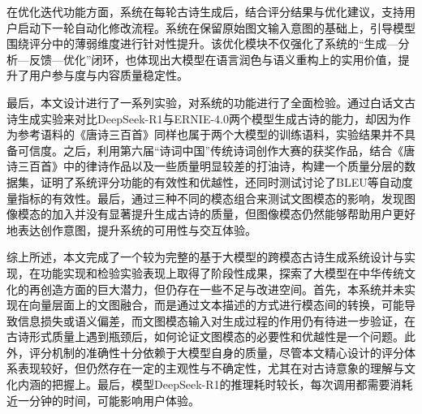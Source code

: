 在优化迭代功能方面，系统在每轮古诗生成后，结合评分结果与优化建议，支持用户启动下一轮自动化修改流程。系统在保留原始图文输入意图的基础上，引导模型围绕评分中的薄弱维度进行针对性提升。该优化模块不仅强化了系统的“生成—分析—反馈—优化”闭环，也体现出大模型在语言润色与语义重构上的实用价值，提升了用户参与度与内容质量稳定性。

最后，本文设计进行了一系列实验，对系统的功能进行了全面检验。通过白话文古诗生成实验来对比DeepSeek-R1与ERNIE-4.0两个模型生成古诗的能力，却因为作为参考语料的《唐诗三百首》同样也属于两个大模型的训练语料，实验结果并不具备可信度。之后，利用第六届“诗词中国”传统诗词创作大赛的获奖作品，结合《唐诗三百首》中的律诗作品以及一些质量明显较差的打油诗，构建一个质量分层的数据集，证明了系统评分功能的有效性和优越性，还同时测试讨论了BLEU等自动度量指标的有效性。最后，通过三种不同的模态组合来测试文图模态的影响，发现图像模态的加入并没有显著提升生成古诗的质量，但图像模态仍然能够帮助用户更好地表达创作意图，提升系统的可用性与交互体验。

综上所述，本文完成了一个较为完整的基于大模型的跨模态古诗生成系统设计与实现，在功能实现和检验实验表现上取得了阶段性成果，探索了大模型在中华传统文化的再创造方面的巨大潜力，但仍存在一些不足与改进空间。首先，本系统并未实现在向量层面上的文图融合，而是通过文本描述的方式进行模态间的转换，可能导致信息损失或语义偏差，而文图模态输入对生成过程的作用仍有待进一步验证，在古诗形式质量上遇到瓶颈后，如何论证文图模态的必要性和优越性是一个问题。此外，评分机制的准确性十分依赖于大模型自身的质量，尽管本文精心设计的评分体系表现较好，但仍然存在一定的主观性与不确定性，尤其在对古诗意象的理解与文化内涵的把握上。最后，模型DeepSeek-R1的推理耗时较长，每次调用都需要消耗近一分钟的时间，可能影响用户体验。


